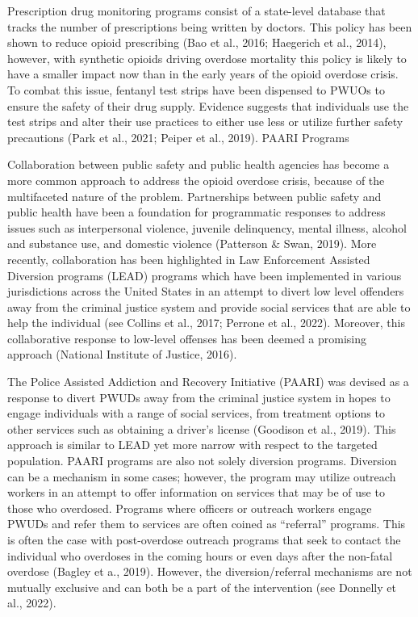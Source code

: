 Prescription drug monitoring programs consist of a state-level database that tracks the number of prescriptions being written by doctors. This policy has been shown to reduce opioid prescribing (Bao et al., 2016; Haegerich et al., 2014), however, with synthetic opioids driving overdose mortality this policy is likely to have a smaller impact now than in the early years of the opioid overdose crisis. To combat this issue, fentanyl test strips have been dispensed to PWUOs to ensure the safety of their drug supply. Evidence suggests that individuals use the test strips and alter their use practices to either use less or utilize further safety precautions (Park et al., 2021; Peiper et al., 2019).
PAARI Programs 

Collaboration between public safety and public health agencies has become a more common approach to address the opioid overdose crisis, because of the multifaceted nature of the problem. Partnerships between public safety and public health have been a foundation for programmatic responses to address issues such as interpersonal violence, juvenile delinquency, mental illness, alcohol and substance use, and domestic violence (Patterson \& Swan, 2019). More recently, collaboration has been highlighted in Law Enforcement Assisted Diversion programs (LEAD) programs which have been implemented in various jurisdictions across the United States in an attempt to divert low level offenders away from the criminal justice system and provide social services that are able to help the individual (see Collins et al., 2017; Perrone et al., 2022). Moreover, this collaborative response to low-level offenses has been deemed a promising approach (National Institute of Justice, 2016).

The Police Assisted Addiction and Recovery Initiative (PAARI) was devised as a response to divert PWUDs away from the criminal justice system in hopes to engage individuals with a range of social services, from treatment options to other services such as obtaining a driver’s license (Goodison et al., 2019). This approach is similar to LEAD yet more narrow with respect to the targeted population. PAARI programs are also not solely diversion programs. Diversion can be a mechanism in some cases; however, the program may utilize outreach workers in an attempt to offer information on services that may be of use to those who overdosed. Programs where officers or outreach workers engage PWUDs and refer them to services are often coined as “referral” programs. This is often the case with post-overdose outreach programs that seek to contact the individual who overdoses in the coming hours or even days after the non-fatal overdose (Bagley et a., 2019). However, the diversion/referral mechanisms are not mutually exclusive and can both be a part of the intervention (see Donnelly et al., 2022).


